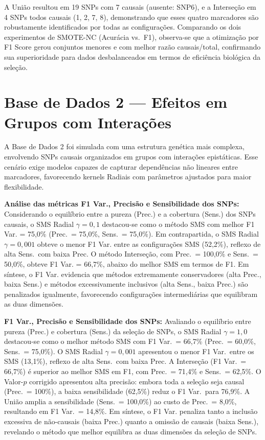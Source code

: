 \documentclass[12pt,a4paper]{article}
\newcommand{\novo}[1]{\textcolor{corNova}{#1}}
\begin{document}
\novo{A União resultou em 19 SNPs com 7 causais (ausente: SNP6), e a Interseção em 4 SNPs todos causais (1, 2, 7, 8), demonstrando que esses quatro marcadores são robustamente identificados por todas as configurações. Comparando os dois experimentos de SMOTE-NC (Acurácia vs.\ F1), observa-se que a otimização por F1 Score gerou conjuntos menores e com melhor razão causais/total, confirmando sua superioridade para dados desbalanceados em termos de eficiência biológica da seleção.}

\section{\novo{Base de Dados 2 --- Efeitos em Grupos com Interações}}

\novo{A Base de Dados 2 foi simulada com uma estrutura genética mais complexa, envolvendo SNPs causais organizados em grupos com interações epistáticas. Esse cenário exige modelos capazes de capturar dependências não lineares entre marcadores, favorecendo kernels Radiais com parâmetros ajustados para maior flexibilidade.}


\novo{
\textbf{Análise das métricas F1 Var., Precisão e Sensibilidade dos SNPs:} Considerando o equilíbrio entre a pureza (Prec.) e a cobertura (Sens.) dos SNPs causais, o SMS Radial $\gamma={0,1}$ destacou-se como o método SMS com melhor F1 Var. = 75,0\% (Prec.\ = 75,0\%, Sens.\ = 75,0\%). Em contrapartida, o SMS Radial $\gamma={0,001}$ obteve o menor F1 Var. entre as configurações SMS (52,2\%), reflexo de alta Sens.\ com baixa Prec. O método Interseção, com Prec.\ = 100,0\% e Sens.\ = 50,0\%, obteve F1 Var. = 66,7\%, abaixo do melhor SMS em termos de F1. Em síntese, o F1 Var. evidencia que métodos extremamente conservadores (alta Prec., baixa Sens.) e métodos excessivamente inclusivos (alta Sens., baixa Prec.) são penalizados igualmente, favorecendo configurações intermediárias que equilibram as duas dimensões.
}


\novo{\textbf{F1 Var., Precisão e Sensibilidade dos SNPs:} Avaliando o equilíbrio entre pureza (Prec.) e cobertura (Sens.) da seleção de SNPs, o SMS Radial $\gamma=1{,}0$ destacou-se como o melhor método SMS com F1 Var.\ = 66,7\% (Prec.\ = 60,0\%, Sens.\ = 75,0\%). O SMS Radial $\gamma=0{,}001$ apresentou o menor F1 Var.\ entre os SMS (13,1\%), reflexo de alta Sens.\ com baixa Prec. A Interseção (F1 Var.\ = 66,7\%) é superior ao melhor SMS em F1, com Prec.\ = 71,4\% e Sens.\ = 62,5\%. O Valor-$p$ corrigido apresentou alta precisão: embora toda a seleção seja causal (Prec.\ = 100\%), a baixa sensibilidade (62,5\%) reduz o F1 Var.\ para 76,9\%. A União amplia a sensibilidade (Sens.\ = 100,0\%) ao custo de Prec.\ = 8,0\%, resultando em F1 Var.\ = 14,8\%. Em síntese, o F1 Var. penaliza tanto a inclusão excessiva de não-causais (baixa Prec.) quanto a omissão de causais (baixa Sens.), revelando o método que melhor equilibra as duas dimensões da seleção de SNPs.}
\end{document}
